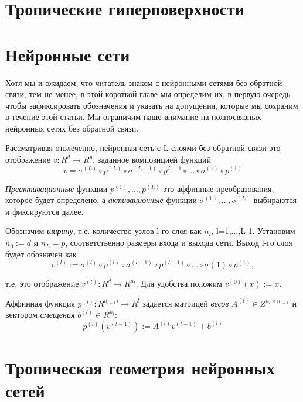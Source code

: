 \documentclass[russian]{lecture-notes}
\begin{document}
	\section{Тропические гиперповерхности}
	
	\section{Нейронные сети}
	
	Хотя мы и ожидаем, что читатель знаком с нейронными сетями без обратной связи, тем не менее, в этой короткой главе мы определим их, в первую очередь чтобы зафиксировать обозначения и указать на допущения, которые мы сохраним в течение этой статьи. Мы ограничим наше внимание на полносвязных нейронных сетях без обратной связи.
	
	Рассматривая отвлеченно, нейронная сеть с L-слоями без обратной связи это отображение $v : R^d \to R^p$, заданное композицией функций
	\begin{equation*}
		v = \sigma^{(L)} \circ p^{(L)} \circ \sigma^{(L-1)} \circ p^{L-1} \circ ... \circ \sigma^{(1)} \circ p^{(1)}
	\end{equation*}
	
	\textit{Преактивационные} функции $p^{(1)},...,p^{(L)}$ это аффинные преобразования, которое будет определено, а \textit{активационные} функции $\sigma^{(1)},...,\sigma^{(L)}$ выбираются и фиксируются далее.
	
	Обозначим \textit{ширину}, т.е. количество узлов l-го слоя как $n_l$, l=1,...,L-1. Установим $n_0 := d$ и $n_L = p$, соответственно размеры входа и выхода сети. Выход l-го слоя будет обозначен как
	\begin{equation*}
		v^{(l)} := \sigma^{(l)} \circ p^{(l)} \circ \sigma^{(l-1)} \circ p^{(l-1)} \circ ... \circ \sigma{(1)} \circ p^{(1)},
	\end{equation*}
	
	т.е. это отображение $v^{(t)} : R^d \to R^{n_l}$. Для удобства положим $v^{(0)}(x) := x$.
	
	Аффинная функция $p^{(l)} : R^{n_{l-1})} \to R^l$ задается матрицей \textit{весов} $A^{(l)} \in Z^{n_l \times n_{l-1}}$ и вектором \textit{смещения} $b^{(l)} \in R^{n_l}$:
	\begin{equation*}
		p^{(l)}(v^{(l-1)}) := A^{(l)}v^{(l-1)} + b^{(l)}
	\end{equation*}
	
	

	\section{Тропическая геометрия нейронных сетей}
	
\end{document}
